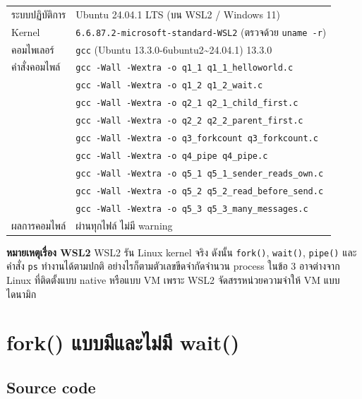 \documentclass[a4paper,12pt]{article}
\newcommand{\code}[1]{\texttt{#1}}
\begin{document}
\begin{tabular}{ll}
\toprule
ระบบปฏิบัติการ & Ubuntu 24.04.1 LTS (บน WSL2 / Windows 11) \\
Kernel & \code{6.6.87.2-microsoft-standard-WSL2} (ตรวจด้วย \code{uname -r}) \\
คอมไพเลอร์ & \code{gcc} (Ubuntu 13.3.0-6ubuntu2\textasciitilde24.04.1) 13.3.0 \\
คำสั่งคอมไพล์ & \code{gcc -Wall -Wextra -o q1\_1 q1\_1\_helloworld.c} \\
 & \code{gcc -Wall -Wextra -o q1\_2 q1\_2\_wait.c} \\
 & \code{gcc -Wall -Wextra -o q2\_1 q2\_1\_child\_first.c} \\
 & \code{gcc -Wall -Wextra -o q2\_2 q2\_2\_parent\_first.c} \\
 & \code{gcc -Wall -Wextra -o q3\_forkcount q3\_forkcount.c} \\
 & \code{gcc -Wall -Wextra -o q4\_pipe q4\_pipe.c} \\
 & \code{gcc -Wall -Wextra -o q5\_1 q5\_1\_sender\_reads\_own.c} \\
 & \code{gcc -Wall -Wextra -o q5\_2 q5\_2\_read\_before\_send.c} \\
 & \code{gcc -Wall -Wextra -o q5\_3 q5\_3\_many\_messages.c} \\
ผลการคอมไพล์ & ผ่านทุกไฟล์ ไม่มี warning \\
\bottomrule
\end{tabular}

\vspace{1em}

\textbf{หมายเหตุเรื่อง WSL2} \quad WSL2 รัน Linux kernel จริง ดังนั้น \code{fork()}, \code{wait()},
\code{pipe()} และคำสั่ง \code{ps} ทำงานได้ตามปกติ อย่างไรก็ตามตัวเลขขีดจำกัดจำนวน process ในข้อ 3
อาจต่างจาก Linux ที่ติดตั้งแบบ native หรือแบบ VM เพราะ WSL2 จัดสรรหน่วยความจำให้ VM แบบไดนามิก

\newpage

\section{fork() แบบมีและไม่มี wait()}

\subsection{Source code}
\end{document}
